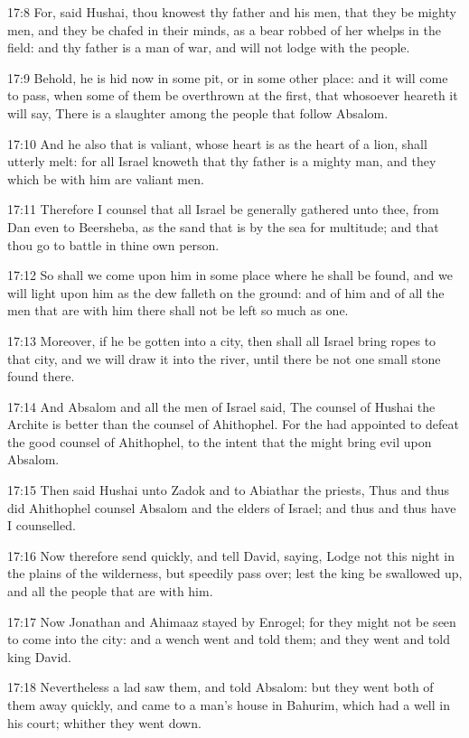 17:8 For, said Hushai, thou knowest thy father and his men, that they be mighty men, and they be chafed in their minds, as a bear robbed of her whelps in the field: and thy father is a man of war, and will not lodge with the people.

17:9 Behold, he is hid now in some pit, or in some other place: and it will come to pass, when some of them be overthrown at the first, that whosoever heareth it will say, There is a slaughter among the people that follow Absalom.

17:10 And he also that is valiant, whose heart is as the heart of a lion, shall utterly melt: for all Israel knoweth that thy father is a mighty man, and they which be with him are valiant men.

17:11 Therefore I counsel that all Israel be generally gathered unto thee, from Dan even to Beersheba, as the sand that is by the sea for multitude; and that thou go to battle in thine own person.

17:12 So shall we come upon him in some place where he shall be found, and we will light upon him as the dew falleth on the ground: and of him and of all the men that are with him there shall not be left so much as one.

17:13 Moreover, if he be gotten into a city, then shall all Israel bring ropes to that city, and we will draw it into the river, until there be not one small stone found there.

17:14 And Absalom and all the men of Israel said, The counsel of Hushai the Archite is better than the counsel of Ahithophel. For the \LORD had appointed to defeat the good counsel of Ahithophel, to the intent that the \LORD might bring evil upon Absalom.

17:15 Then said Hushai unto Zadok and to Abiathar the priests, Thus and thus did Ahithophel counsel Absalom and the elders of Israel; and thus and thus have I counselled.

17:16 Now therefore send quickly, and tell David, saying, Lodge not this night in the plains of the wilderness, but speedily pass over; lest the king be swallowed up, and all the people that are with him.

17:17 Now Jonathan and Ahimaaz stayed by Enrogel; for they might not be seen to come into the city: and a wench went and told them; and they went and told king David.

17:18 Nevertheless a lad saw them, and told Absalom: but they went both of them away quickly, and came to a man's house in Bahurim, which had a well in his court; whither they went down.

